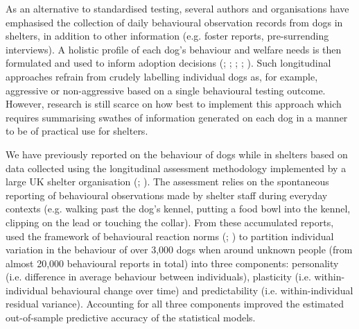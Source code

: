 \documentclass[12pt]{article}
\begin{document}
As an alternative to standardised testing, several authors and organisations have emphasised the collection of daily behavioural observation records from dogs in shelters, in addition to other information (e.g. foster reports, pre-surrending interviews). A holistic profile of each dog's behaviour and welfare needs is then formulated and used to inform adoption decisions (\cite{patronek2019}; \cite{ASPCA2018}; \cite{rayment2015}; \cite{mornement2015}; \cite{clay2020}). Such longitudinal approaches refrain from crudely labelling individual dogs as, for example, aggressive or non-aggressive based on a single behavioural testing outcome. However, research is still scarce on how best to implement this approach which requires summarising swathes of information generated on each dog in a manner to be of practical use for shelters.

We have previously reported on the behaviour of dogs while in shelters based on data collected using the longitudinal assessment methodology implemented by a large UK shelter organisation (\cite{goold2017aggressiveness}; \cite{goold2017modelling}). The assessment relies on the spontaneous reporting of behavioural observations made by shelter staff during everyday contexts (e.g. walking past the dog's kennel, putting a food bowl into the kennel, clipping on the lead or touching the collar). From these accumulated reports, \textcite{goold2017modelling} used the framework of behavioural reaction norms (\cite{dingemanse2010}; \cite{cleasby2015}) to partition individual variation in the behaviour of over 3,000 dogs when around unknown people (from almost 20,000 behavioural reports in total) into three components: personality (i.e. difference in average behaviour between individuals), plasticity (i.e. within-individual behavioural change over time) and predictability (i.e. within-individual residual variance). Accounting for all three components improved the estimated out-of-sample predictive accuracy of the statistical models.
\end{document}
